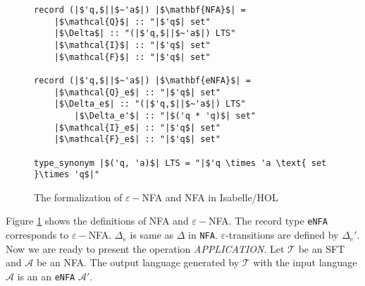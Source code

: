 \documentclass[a4paper,UKenglish,cleveref, autoref, thm-restate]{lipics-v2021}
\begin{document}
\begin{figure}[t]
	\begin{lstlisting}
record (|$'q,$||$~'a$|) |$\mathbf{NFA}$| =
	|$\mathcal{Q}$| :: "|$'q$| set"
	|$\Delta$| :: "(|$'q,$||$~'a$|) LTS"
	|$\mathcal{I}$| :: "|$'q$| set"
	|$\mathcal{F}$| :: "|$'q$| set"

record (|$'q,$||$~'a$|) |$\mathbf{eNFA}$| =
	|$\mathcal{Q}_e$| :: "|$'q$| set"
	|$\Delta_e$| :: "(|$'q,$||$~'a$|) LTS"
        |$\Delta_e'$| :: "|$('q * 'q)$| set"
	|$\mathcal{I}_e$| :: "|$'q$| set"
	|$\mathcal{F}_e$| :: "|$'q$| set"

type_synonym |$('q, 'a)$| LTS = "|$'q \times 'a \text{ set }\times 'q$|"    
	\end{lstlisting}
\caption{The formalization of $\varepsilon-$NFA and NFA in Isabelle/HOL}
\label{fig-def-FAs}
\end{figure}

Figure \ref{fig-def-FAs} shows the definitions of NFA and $\varepsilon-$NFA.
The record type \texttt{eNFA} corresponds to $\varepsilon-$NFA. $\Delta_e$ is same as $\Delta$ in \texttt{NFA}. $\varepsilon$-transitions are defined by $\Delta_e'$.  Now we are ready to present the operation \emph{APPLICATION}. Let $\mathcal{T}$ be an SFT and  $\mathcal{A}$ be an NFA. The output language generated by $\mathcal{T}$ with the input language $\mathcal{A}$ is an an \texttt{eNFA} $\mathcal{A}'$. 
\end{document}
